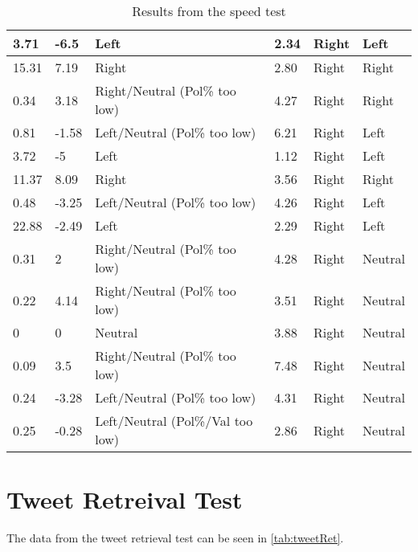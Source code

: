 \begin{table}[H]
{\begin{tabular}{|l|l|l|l|l|l|}
3.71	&	-6.5	&	Left								&	2.34	&	Right		&	Left	\\\hline
15.31	&	7.19	&	Right								&	2.80	&	Right		&	Right	\\\hline
0.34	&	3.18	&	Right/Neutral (Pol\% too low)		&	4.27	&	Right		&	Right	\\\hline
0.81	&	-1.58	&	Left/Neutral (Pol\% too low)		&	6.21	&	Right		&	Left	\\\hline
3.72	&	-5		&	Left								&	1.12	&	Right		&	Left	\\\hline
11.37	&	8.09	&	Right								&	3.56	&	Right		&	Right	\\\hline
0.48	&	-3.25	&	Left/Neutral (Pol\% too low)		&	4.26	&	Right		&	Left	\\\hline
22.88	&	-2.49	&	Left								&	2.29	&	Right		&	Left	\\\hline
0.31	&	2		&	Right/Neutral (Pol\% too low)		&	4.28	&	Right		&	Neutral	\\\hline
0.22	&	4.14	&	Right/Neutral (Pol\% too low)		&	3.51	&	Right		&	Neutral	\\\hline
0		&	0		&	Neutral								&	3.88	&	Right		&	Neutral	\\\hline
0.09	&	3.5		&	Right/Neutral (Pol\% too low)		&	7.48	&	Right		&	Neutral	\\\hline
0.24	&	-3.28	&	Left/Neutral (Pol\% too low)		&	4.31	&	Right		&	Neutral	\\\hline
0.25	&	-0.28	&	Left/Neutral (Pol\%/Val too low)	&	2.86	&	Right		&	Neutral	\\\hline

\end{tabular}}
\caption{Results from the speed test}
\label{speedTestRes}
\end{table}





\chapter{Tweet Retreival Test}\label{app:tweetRet}
The data from the tweet retrieval test can be seen in \autoref{tab:tweetRet}.



